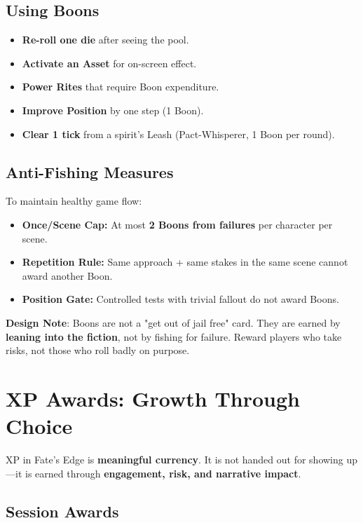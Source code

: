 \subsection*{Using Boons}

\begin{itemize}
    \item \textbf{Re-roll one die} after seeing the pool.
    \item \textbf{Activate an Asset} for on-screen effect.
    \item \textbf{Power Rites} that require Boon expenditure.
    \item \textbf{Improve Position} by one step (1 Boon).
    \item \textbf{Clear 1 tick} from a spirit's Leash (Pact-Whisperer, 1 Boon per round).
\end{itemize}

\subsection*{Anti-Fishing Measures}

To maintain healthy game flow:

\begin{itemize}
    \item \textbf{Once/Scene Cap:} At most \textbf{2 Boons from failures} per character per scene.
    \item \textbf{Repetition Rule:} Same approach + same stakes in the same scene cannot award another Boon.
    \item \textbf{Position Gate:} Controlled tests with trivial fallout do not award Boons.
\end{itemize}

\textbf{Design Note}: Boons are not a "get out of jail free" card. They are earned by \textbf{leaning into the fiction}, not by fishing for failure. Reward players who take risks, not those who roll badly on purpose.

\section*{XP Awards: Growth Through Choice}

XP in Fate's Edge is \textbf{meaningful currency}. It is not handed out for showing up---it is earned through \textbf{engagement, risk, and narrative impact}.

\subsection*{Session Awards}

